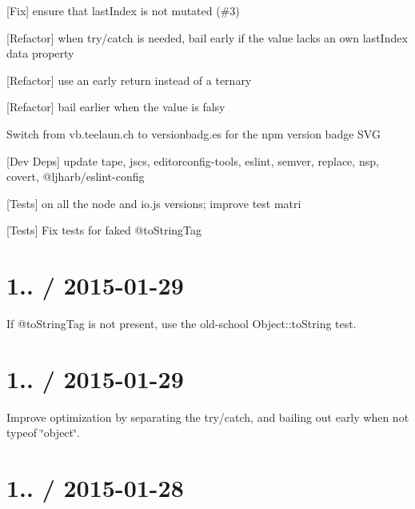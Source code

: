 
\begin{DoxyItemize}
\item \mbox{[}Fix\mbox{]} ensure that {\ttfamily last\+Index} is not mutated (\#3)
\item \mbox{[}Refactor\mbox{]} when try/catch is needed, bail early if the value lacks an own {\ttfamily last\+Index} data property
\item \mbox{[}Refactor\mbox{]} use an early return instead of a ternary
\item \mbox{[}Refactor\mbox{]} bail earlier when the value is falsy
\item Switch from vb.\+teelaun.\+ch to versionbadg.\+es for the npm version badge S\+VG
\item \mbox{[}Dev Deps\mbox{]} update {\ttfamily tape}, {\ttfamily jscs}, {\ttfamily editorconfig-\/tools}, {\ttfamily eslint}, {\ttfamily semver}, {\ttfamily replace}, {\ttfamily nsp}, {\ttfamily covert}, {\ttfamily @ljharb/eslint-\/config}
\item \mbox{[}Tests\mbox{]} on all the node and io.\+js versions; improve test matri
\item \mbox{[}Tests\mbox{]} Fix tests for faked @to\+String\+Tag
\end{DoxyItemize}

\section*{1.. / 2015-\/01-\/29 }


\begin{DoxyItemize}
\item If @to\+String\+Tag is not present, use the old-\/school Object\+::to\+String test.
\end{DoxyItemize}

\section*{1.. / 2015-\/01-\/29 }


\begin{DoxyItemize}
\item Improve optimization by separating the try/catch, and bailing out early when not typeof \char`\"{}object\char`\"{}.
\end{DoxyItemize}

\section*{1.. / 2015-\/01-\/28 }


